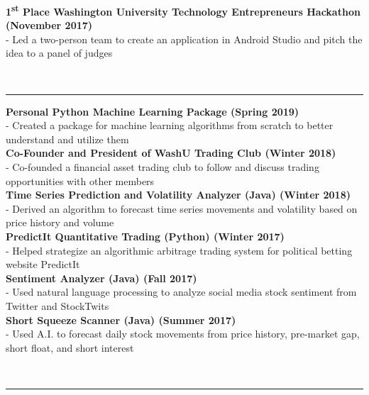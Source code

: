 \documentclass[12pt]{article}
\begin{document}
\begin{titlepage}
\begin{addmargin}[1em]{0em}
			\textbf{1\textsuperscript{st} Place Washington University Technology Entrepreneurs Hackathon \hfill (November 2017)}\\
- Led a two-person team to create an application in Android Studio and pitch the idea to a panel of judges \\
		\end{addmargin}
		\vspace{-10pt}
		\noindent
		\\\rule{\textwidth}{0.4pt}
		\begin{addmargin}[1em]{0em}
			\textbf{Personal Python Machine Learning Package \hfill (Spring 2019)}\\
- Created a package for machine learning algorithms from scratch to better understand and utilize them\\
			\textbf{Co-Founder and President of WashU Trading Club \hfill (Winter 2018)}\\
- Co-founded a financial asset trading club to follow and discuss trading opportunities with other members\\
			\textbf{Time Series Prediction and Volatility Analyzer (Java) \hfill (Winter 2018)}\\
- Derived an algorithm to forecast time series movements and volatility based on price history and volume \\
			\textbf{PredictIt Quantitative Trading (Python) \hfill (Winter 2017)}\\
- Helped strategize an algorithmic arbitrage trading system for political betting website PredictIt \\
			\textbf{Sentiment Analyzer (Java) \hfill (Fall 2017)}\\
- Used natural language processing to analyze social media stock sentiment from Twitter and StockTwits\\
			\textbf{Short Squeeze Scanner (Java) \hfill (Summer 2017)}\\
- Used A.I. to forecast daily stock movements from price history, pre-market gap, short float, and short interest\\
		\end{addmargin}
		\vspace{-10pt}
		\noindent
		\\\rule{\textwidth}{0.4pt}
		\begin{addmargin}[1em]{0em}

\end{addmargin}
\end{titlepage}
\end{document}
